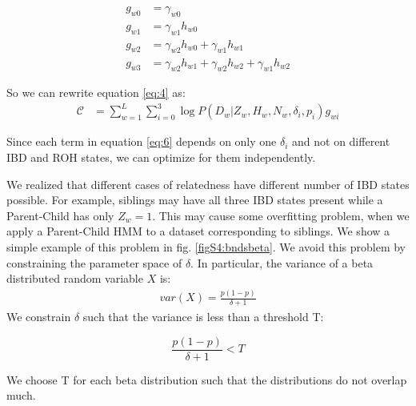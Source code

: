 \documentclass[12pt, letterpaper]{article}
\begin{document}
\begin{align*}\label{eq:5}
g_{w0} &= \gamma_{w0}\\
g_{w1} &= \gamma_{w1} h_{w0}\\
g_{w2} &= \gamma_{w2} h_{w0} + \gamma_{w1} h_{w1}\\
g_{w3} &= \gamma_{w2} h_{w1} + \gamma_{w2} h_{w2} + \gamma_{w1} h_{w2}
\end{align*}

So we can rewrite equation \ref{eq:4} as:
\begin{align}\label{eq:6}
\mathcal{C} &= \sum_{w=1}^L\sum_{i=0}^3 \log P(D_{w}|Z_w, H_w, N_w, \delta_i, p_i)g_{wi}
\end{align}

Since each term in equation \ref{eq:6}  depends on only one $\delta_i$ and not on different IBD and ROH states, we can optimize for them independently.

We realized that different cases of relatedness have different number of IBD states possible. For example, siblings may have all three IBD states present while a Parent-Child has only $Z_w=1$. This may cause some overfitting problem, when we apply a Parent-Child HMM to a dataset corresponding to siblings. We show a simple example of this problem in fig. \ref{figS4:bndsbeta}. We avoid this problem by constraining the parameter space of $\delta$. 
In particular, the variance of a beta distributed random variable $X$ is:
\begin{align}\label{eq:7}
    var(X) = \frac{p(1-p)}{\delta + 1}
\end{align}
We constrain $\delta$ such that  the variance is less than a threshold T:

\begin{equation}\label{eq:8}
    \frac{p(1-p)}{\delta + 1}  < T
\end{equation}

We choose T for each beta distribution such that the distributions do not overlap much.
\end{document}
